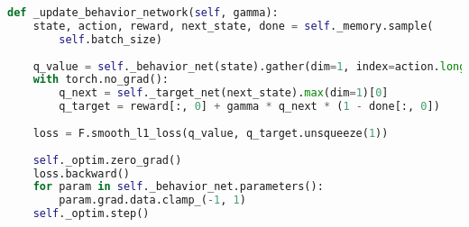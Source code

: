 \begin{lstlisting}[language=Python, caption={Python code of \textcolor{blue}{\textbf{\_update\_behavior\_network}} of DQN for \textit{BreakoutNoFrameskip-v4}.}, label={dqn-breakout-update-behavior-network}]
def _update_behavior_network(self, gamma):
    state, action, reward, next_state, done = self._memory.sample(
        self.batch_size)
    
    q_value = self._behavior_net(state).gather(dim=1, index=action.long())
    with torch.no_grad():
        q_next = self._target_net(next_state).max(dim=1)[0]
        q_target = reward[:, 0] + gamma * q_next * (1 - done[:, 0])
        
    loss = F.smooth_l1_loss(q_value, q_target.unsqueeze(1))
    
    self._optim.zero_grad()
    loss.backward()
    for param in self._behavior_net.parameters():
        param.grad.data.clamp_(-1, 1)
    self._optim.step()\end{lstlisting}
